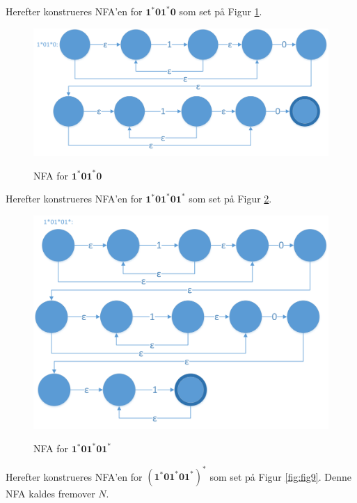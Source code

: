 \documentclass[a4paper,10pt,article]{memoir}
\begin{document}
\begin{eksempel}
Herefter konstrueres NFA'en for $\mathbf{1^*01^*0}$ som set på Figur \ref{fig:fig7}. 

\begin{figure}[H]%
{\centering 
\includegraphics[width=\textwidth]{Fig7x.png}
} \caption{NFA for $\mathbf{1^*01^*0}$}
\label{fig:fig7}
\end{figure}

Herefter konstrueres NFA'en for $\mathbf{1^*01^*01^*}$ som set på Figur \ref{fig:fig8}. 

\begin{figure}[H]%
{\centering 
\includegraphics[width=\textwidth]{Fig8x.png}
} \caption{NFA for $\mathbf{1^*01^*01^*}$}
\label{fig:fig8}
\end{figure}

Herefter konstrueres NFA'en for $\mathbf{(1^*01^*01^*)^*}$ som set på Figur \ref{fig:fig9}. Denne NFA kaldes fremover $N$.


\end{eksempel}
\end{document}
